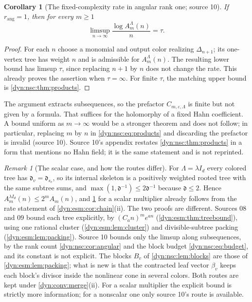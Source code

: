 \documentclass[11pt,letterpaper]{article}
\newtheorem{corollary}[corollary]{Corollary}
\theoremstyle{definition}
\theoremstyle{remark}
\newtheorem{remark}[remark]{Remark}
\newcommand{\eps}{\varepsilon}
\newcommand{\rang}{r_{\mathrm{ang}}}
\numberwithin{equation}{section}
\begin{document}
\begin{corollary}[The fixed-complexity rate in angular rank one; source 10]
\label{dyn:nsc:cor:rankone}
If $\rang=1$, then for every $m\ge1$
\[
 \limsup_{n\to\infty}\frac{\log A^{\Lambda}_m(n)}{n}=\tau .
\]
\end{corollary}
\begin{proof}
For each $n$ choose a monomial and output color realizing $\Delta_{n+1}$;
its one-vertex tree has
weight $n$ and is admissible for $A^{\Lambda}_m(n)$. The resulting lower
bound has limsup $\tau$, since replacing $n+1$ by $n$ does not change the
rate. This already proves the assertion when $\tau=\infty$. For finite
$\tau$, the matching upper bound is \cref{dyn:nsc:thm:products}.
\end{proof}

The argument extracts subsequences, so the prefactor $C_{m,\eps,\Lambda}$ is
finite but not given by a formula. That suffices for the holomorphy of a
fixed Hahn coefficient. A bound uniform as $m\to\infty$ would be a stronger
theorem and does not follow; in particular, replacing $m$ by $n$ in
\eqref{dyn:nsc:eq:products} and discarding the prefactor is invalid
(source 10). Source 10's appendix restates \cref{dyn:nsc:thm:products} in a
form that mentions no Hahn field; it is the same statement and is not
reprinted.

\begin{remark}[The scalar case, and how the routes differ]
\label{dyn:nsc:rem:scalar}
For $\Lambda=\lambda I_d$ every colored tree has $\mathfrak d_v=\mathfrak d_{s_v}$,
so its internal skeleton is a positively weighted rooted tree with the same
subtree sums, and $\max(1,\mathfrak d^{-1})\le2\mathfrak d^{-1}$ because
$\mathfrak d\le2$. Hence $A^{\lambda I_d}_m(n)\le2^{m}A_m(n)$, and
\cref{dyn:nsc:cor:rankone} for a scalar multiplier already follows from the
rate statement of \cref{dyn:esm:cor:chain}(ii). The two proofs are different. Sources 08 and 09
bound each tree explicitly, by $(C_an)^{m}e^{an}$
(\cref{dyn:esm:thm:treebound}), using one rational cluster
(\cref{dyn:esm:lem:cluster}) and divisible-subtree packing
(\cref{dyn:esm:lem:packing}). Source 10 bounds only the limsup along
subsequences, by the rank count \cref{dyn:nsc:cor:angular} and the block
budget \eqref{dyn:nsc:eq:budget}, and its constant is not explicit. The
blocks $B_v$ of \cref{dyn:nsc:lem:blocks} are those of
\cref{dyn:esm:lem:packing}; what is new is that the contracted leaf vector
$\beta_v$ keeps each block's divisor inside the nonlinear cone in several
colors. Both routes are kept under \cref{dyn:conv:merge}(ii). For a scalar
multiplier the explicit bound is strictly more information; for a nonscalar
one only source 10's route is available.
\end{remark}
\end{document}
